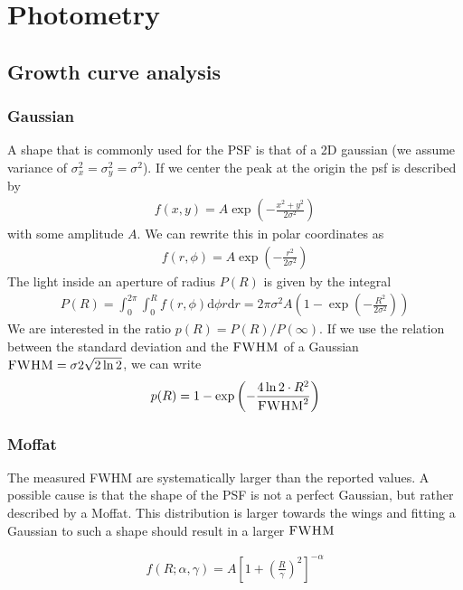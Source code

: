 \chapter{Photometry}

\section{Growth curve analysis}

\subsection{Gaussian}

A shape that is commonly used for the PSF is that of a 2D gaussian (we assume  variance of $\sigma_x^2 = \sigma_y^2 = \sigma^2$). If we center the peak at the origin the \gls{psf} is described by
\begin{align}
f(x,y) = A \exp\left(-\frac{x^2+y^2}{2\sigma^2}\right)
\end{align}
with some amplitude $A$. We can rewrite this in polar coordinates as 
\begin{align}
f(r,\phi) = A \exp\left(-\frac{r^2}{2\sigma^2}\right)
\end{align}
The light inside an aperture of radius $P(R)$ is given by the integral
\begin{align}
P(R) = \int_0^{2\pi} \int_0^R f(r,\phi) \mathrm{d} \phi r \mathrm{d} r = 2\pi \sigma^2 A \left(1-\exp \left(-\frac{R^2}{2\sigma^2}\right) \right) 
\end{align}
We are interested in the ratio $p(R) = P(R) / P(\infty)$. If we use the relation between the standard deviation and the $\textsc{FWHM}$ of a Gaussian $\textsc{FWHM} = \sigma  2\sqrt{2\ln2}$, we can write
\begin{align}
p(R) = 1-\exp\left(- \frac{4 \ln 2 \cdot R^2}{\textsc{FWHM}^2} \right)
\end{align}

\subsection{Moffat}

The measured FWHM are systematically larger than the reported values. A possible cause is that the shape of the PSF is not a perfect Gaussian, but rather described by a Moffat. This distribution is larger towards the wings and fitting a Gaussian to such a shape should result in a larger $\textsc{FWHM}$

\begin{align}
f(R;\alpha,\gamma) = A \left[1 + \left(\frac{R}{\gamma}\right)^2 \right]^{- \alpha}
\end{align}


